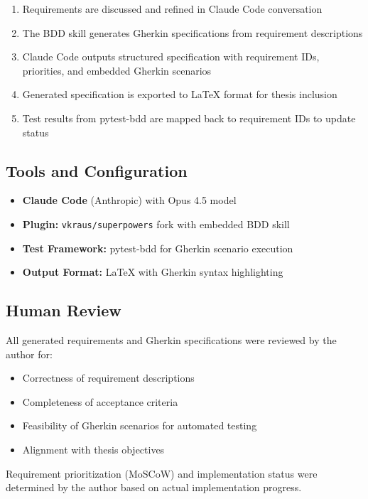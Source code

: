 \begin{enumerate}
    \item Requirements are discussed and refined in Claude Code conversation
    \item The BDD skill generates Gherkin specifications from requirement descriptions
    \item Claude Code outputs structured specification with requirement IDs, priorities, and embedded Gherkin scenarios
    \item Generated specification is exported to \LaTeX{} format for thesis inclusion
    \item Test results from pytest-bdd are mapped back to requirement IDs to update status
\end{enumerate}

\subsection*{Tools and Configuration}

\begin{itemize}
    \item \textbf{Claude Code} (Anthropic) with Opus 4.5 model
    \item \textbf{Plugin:} \texttt{vkraus/superpowers} fork with embedded BDD skill
    \item \textbf{Test Framework:} pytest-bdd for Gherkin scenario execution
    \item \textbf{Output Format:} \LaTeX{} with Gherkin syntax highlighting
\end{itemize}

\subsection*{Human Review}

All generated requirements and Gherkin specifications were reviewed by the author for:
\begin{itemize}
    \item Correctness of requirement descriptions
    \item Completeness of acceptance criteria
    \item Feasibility of Gherkin scenarios for automated testing
    \item Alignment with thesis objectives
\end{itemize}

Requirement prioritization (MoSCoW) and implementation status were determined by the author based on actual implementation progress.
